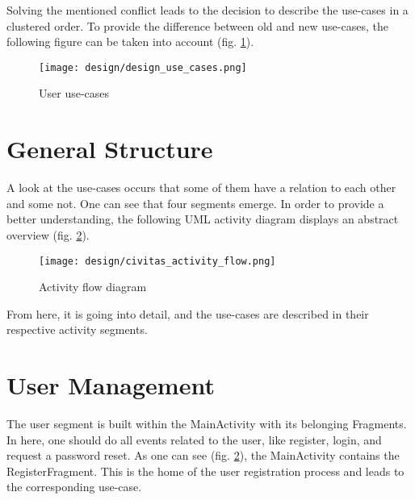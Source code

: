 Solving the mentioned conflict leads to the decision to describe the use-cases in a clustered order.
To provide the difference between old and new use-cases, the following figure can be taken into account (fig. \ref{fig:designUseCases}).
 
\begin{figure}[H]
	\centering \texttt{[image: design/design\_use\_cases.png]}
	\caption{User use-cases}
	\label{fig:designUseCases}
\end{figure}

\section{General Structure}
A look at the use-cases occurs that some of them have a relation to each other and some not. One can see that four segments emerge. In order to provide a better understanding, the following UML activity diagram displays an abstract overview (fig. \ref{fig:activity_flow_generall}).

\begin{figure}[H]
	\centering \texttt{[image: design/civitas\_activity\_flow.png]}
	\caption{Activity flow diagram}
	\label{fig:activity_flow_generall}
\end{figure}

From here, it is going into detail, and the use-cases are described in their respective activity segments.


\section{User Management}
The user segment is built within the MainActivity with its belonging Fragments. In here, one should do all events related to the user, like register, login, and request a password reset. As one can see (fig. \ref{fig:activity_flow_generall}), the MainActivity contains the RegisterFragment. This is the home of the user registration process and leads to the corresponding use-case.

